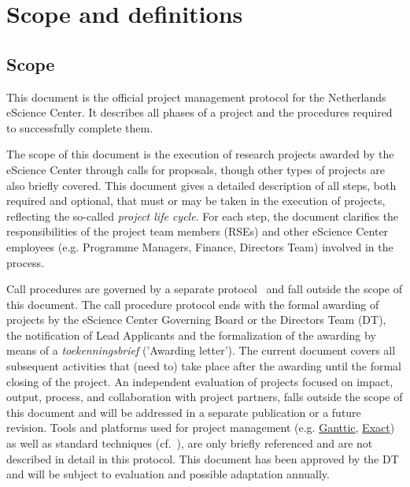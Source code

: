\section{Scope and definitions}
\label{sec:scope}

\subsection{Scope}
\label{sec:scope:sc}

This document is the official project management protocol for the Netherlands eScience Center. It describes all phases
of a project and the procedures required to successfully complete them.

The scope of this document is the execution of research projects awarded by the eScience Center through calls for
proposals, though other types of projects are also briefly covered. This document gives a detailed description of all
steps, both required and optional, that must or may be taken in the execution of projects, reflecting the so-called
\textit{project life cycle}. For each step, the document clarifies the responsibilities of the project team members
(RSEs) and other eScience Center employees (e.g. Programme Managers, Finance, Directors Team) involved in the
process.

Call procedures are governed by a separate protocol~\cite{call-protocol-2015} and fall outside the scope of this document. 
The call procedure protocol ends with the formal awarding of projects by the eScience
Center Governing Board or the Directors Team (DT), the notification of Lead Applicants and the formalization of the
awarding by means of a \textit{toekenningsbrief} ('Awarding letter’). 
The current document covers all subsequent activities that (need to) take place after the awarding until the formal closing
of the project. An independent evaluation of projects focused on impact, output, process, and 
collaboration with project partners, falls outside the scope of this document and will be addressed in a separate publication or a future revision.
Tools and platforms used for project management (e.g. \href{https://www.ganttic.com/}{Ganttic}, \href{https://www.exact.com/}{Exact}) as well as standard techniques
(cf.~\cite{pmpm:31,brooks1995mythical,demarco2016peopleware,the_turing_way-2023,intro:2025talk}), are only briefly referenced and are not described in detail in this protocol.
This document has been approved by the DT and will be subject to evaluation and possible adaptation annually.

